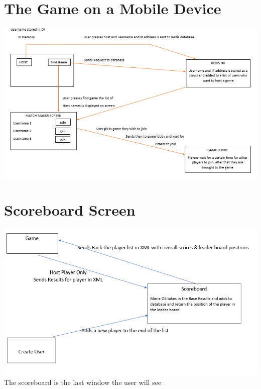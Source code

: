 \section{The Game on a Mobile Device}

\includegraphics[width=1\columnwidth]{img/redisMatch.PNG}

\section{Scoreboard Screen}

\includegraphics[width=1\columnwidth]{img/scoreBoard.PNG}
The scoreboard is the last window the user will see